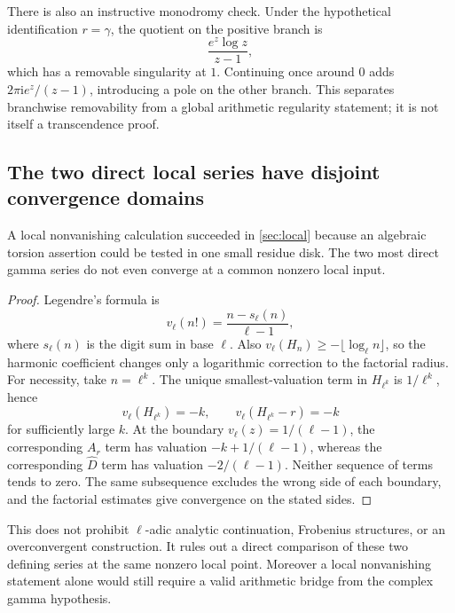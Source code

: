\documentclass[11pt,a4paper]{article}
\numberwithin{equation}{section}
\newtheorem{proposition}[theorem]{Proposition}
\theoremstyle{definition}
\theoremstyle{remark}
\newcommand{\ii}{\mathrm i}
\begin{document}
There is also an instructive monodromy check. Under the hypothetical
identification $r=\gamma$, the quotient on the positive branch is
\[
 \frac{e^z\log z}{z-1},
\]
which has a removable singularity at $1$. Continuing once around $0$
adds $2\pi\ii e^z/(z-1)$, introducing a pole on the other branch.
This separates branchwise removability from a global arithmetic
regularity statement; it is not itself a transcendence proof.

\subsection{The two direct local series have disjoint convergence domains}
A local nonvanishing calculation succeeded in \cref{sec:local} because
an algebraic torsion assertion could be tested in one small residue disk.
The two most direct gamma series do not even converge at a common nonzero
local input.

\begin{proof}
Legendre's formula is
\[
 v_\ell(n!)=\frac{n-s_\ell(n)}{\ell-1},
\]
where $s_\ell(n)$ is the digit sum in base $\ell$. Also
$v_\ell(H_n)\ge-\lfloor\log_\ell n\rfloor$, so the harmonic coefficient
changes only a logarithmic correction to the factorial radius.
For necessity, take $n=\ell^k$. The unique smallest-valuation term in
$H_{\ell^k}$ is $1/\ell^k$, hence
\[
 v_\ell(H_{\ell^k})=-k,
 \qquad v_\ell(H_{\ell^k}-r)=-k
\]
for sufficiently large $k$. At the boundary
$v_\ell(z)=1/(\ell-1)$, the corresponding $A_r$ term has valuation
$-k+1/(\ell-1)$, whereas the corresponding $\widehat D$ term has
valuation $-2/(\ell-1)$. Neither sequence of terms tends to zero.
The same subsequence excludes the wrong side of each boundary, and the
factorial estimates give convergence on the stated sides.
\end{proof}
This does not prohibit $\ell$-adic analytic continuation, Frobenius
structures, or an overconvergent construction. It rules out a direct
comparison of these two defining series at the same nonzero local point.
Moreover a local nonvanishing statement alone would still require a
valid arithmetic bridge from the complex gamma hypothesis.
\end{document}
